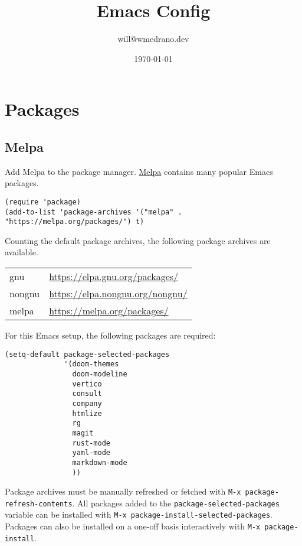 \documentclass[11pt]{article}
\author{will@wmedrano.dev}
\date{\today}
\title{Emacs Config}
\begin{document}
\maketitle
\tableofcontents

\section{Packages}
\label{sec:org62fdd3f}

\subsection{Melpa}
\label{sec:org34a17b1}

Add Melpa to the package manager. \href{https://melpa.org}{Melpa} contains many popular Emacs packages.

\begin{verbatim}
(require 'package)
(add-to-list 'package-archives '("melpa" . "https://melpa.org/packages/") t)
\end{verbatim}

Counting the default package archives, the following package archives are
available.

\begin{center}
\begin{tabular}{ll}
gnu & \url{https://elpa.gnu.org/packages/}\\
nongnu & \url{https://elpa.nongnu.org/nongnu/}\\
melpa & \url{https://melpa.org/packages/}\\
\end{tabular}
\end{center}

For this Emacs setup, the following packages are required:

\begin{verbatim}
(setq-default package-selected-packages
              '(doom-themes
                doom-modeline
                vertico
                consult
                company
                htmlize
                rg
                magit
                rust-mode
                yaml-mode
                markdown-mode
                ))
\end{verbatim}

Package archives must be manually refreshed or fetched with \texttt{M-x
package-refresh-contents}. All packages added to the \texttt{package-selected-packages}
variable can be installed with \texttt{M-x package-install-selected-packages}. Packages
can also be installed on a one-off basis interactively with \texttt{M-x
package-install}.
\end{document}
